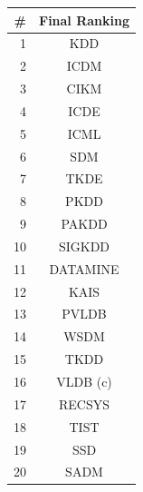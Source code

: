 \begin{table}[htbp]
\begin{tabular}{rc}
\toprule
\#		&	Final Ranking \\ 
\midrule
1		&		KDD			\\
2		&		ICDM		\\
3		&		CIKM		\\
4		&		ICDE		\\
5		&		ICML		\\
6		&		SDM			\\
7		&		TKDE		\\
8		&		PKDD		\\
9		&		PAKDD		\\
10		&		SIGKDD		\\
11		&		DATAMINE	\\
12		&		KAIS		\\
13		&		PVLDB		\\
14		&		WSDM		\\
15		&		TKDD		\\
16		&		VLDB (c)	\\
17		&		RECSYS		\\
18		&		TIST		\\
19		&		SSD			\\
20		&		SADM		\\
\bottomrule
\end{tabular}
\end{table}


















